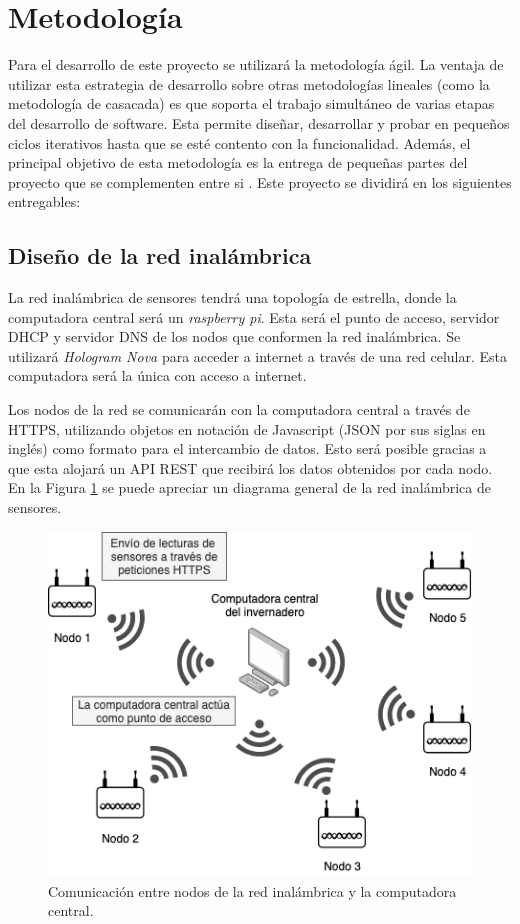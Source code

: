 \section{Metodología}

Para el desarrollo de este proyecto se utilizará la metodología ágil. La ventaja de utilizar esta estrategia de desarrollo sobre otras metodologías lineales (como la metodología de casacada) es que soporta el trabajo simultáneo de varias etapas del desarrollo de software. Esta permite diseñar, desarrollar y probar en pequeños ciclos iterativos hasta que se esté contento con la funcionalidad. Además, el principal objetivo de esta metodología es la entrega de pequeñas partes del proyecto que se complementen entre si \cite{what_is_agile_meth}. Este proyecto se dividirá en los siguientes entregables:

\subsection{Diseño de la red inalámbrica}
La red inalámbrica de sensores tendrá una topología de estrella, donde la computadora central será un \textit{raspberry pi}. Esta será el punto de acceso, servidor DHCP y servidor DNS de los nodos que conformen la red inalámbrica. Se utilizará \textit{Hologram Nova} para acceder a internet a través de una red celular. Esta computadora será la única con acceso a internet.

Los nodos de la red se comunicarán con la computadora central a través de HTTPS, utilizando objetos en notación de Javascript (JSON por sus siglas en inglés) como formato para el intercambio de datos. Esto será posible gracias a que esta alojará un API REST que recibirá los datos obtenidos por cada nodo. En la Figura \ref{fig:coms_nodos_raspberry} se puede apreciar un diagrama general de la red inalámbrica de sensores.

\begin{figure}[!ht]
	\centering
	\includegraphics[width=.60\linewidth]{imagenes/diagramas/comunicacion_nodos_raspberry.png}
	\caption{Comunicación entre nodos de la red inalámbrica y la computadora central.}
	\label{fig:coms_nodos_raspberry}
\end{figure}

